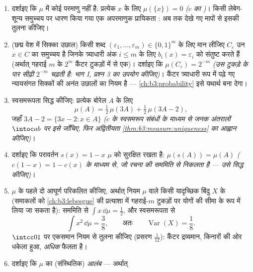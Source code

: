 \begin{problem}
\begin{enumerate}[resume]
\[        \]
        अर्थात् $\mu$ और $\lambda$ असंयुक्त वाहकों ($C$ और उसके
        पूरक) पर रहते हैं। इस स्थिति वाले दो  \emph{परस्पर
        एकल} कहलाते हैं, और $\mu \perp
        \lambda$ लिखा जाता है।
  \item दर्शाइए कि $\mu$ में कोई परमाणु नहीं है: प्रत्येक $x$
        के लिए $\mu(\{x\}) = 0$ \emph{($c$ का )}। किसी
        लेबेग-शून्य  समुच्चय पर धारण किया गया एक अपरमाणुक
        प्रायिकता : अब तक देखे गए मापों से इसकी तुलना कीजिए।
  \item (छद्म वेश में सिक्का उछाल) किसी शब्द $(\varepsilon_1,
        \dots, \varepsilon_m) \in \{0,1\}^m$ के लिए मान
        लीजिए $C_{\varepsilon}$ उन $x \in C$ का समुच्चय है जिनके त्र्याधारी अंक
        $i \leq m$ के लिए $b_i(x) = \varepsilon_i$ को संतुष्ट करते हैं (अर्थात् गहराई
        $m$ के $2^m$ कैंटर टुकड़ों में से एक)। दर्शाइए कि
        $\mu(C_\varepsilon) = 2^{-m}$ \emph{(उस टुकड़े के पार सीढ़ी $2^{-m}$ चढ़ती है:
        भाग I, प्रश्न 3 का उपयोग कीजिए)}। कैंटर  त्र्याधारी
        रूप में पढ़े गए न्यायसंगत सिक्कों की अनंत उछालों का नियम
        है --- \cref{ch:b3:probability} इसे यथार्थ बना देगा।
  \item स्वसमरूपता सिद्ध कीजिए: प्रत्येक बोरेल $A$ के लिए
        \[
        \mu(A) = \tfrac12\,\mu(3A) +
        \tfrac12\,\mu(3A - 2) ,
        \]
        जहाँ $3A - 2 = \{3x - 2 : x \in A\}$ \emph{($c$ के स्वसमरूप संबंधों के माध्यम से
        जनक अंतरालों $\intoc ab$ पर इसे जाँचिए, फिर अद्वितीयता \cref{thm:b3:measure:uniqueness}
        का आह्वान कीजिए)}।
  \item दर्शाइए कि परावर्तन $s(x) = 1 - x$ $\mu$ को सुरक्षित रखता है:
        $\mu(s(A)) = \mu(A)$ \emph{($c(1 - x) = 1 -
        c(x)$ के माध्यम से, जो रचना की सममिति से
        निकलता है --- उसे सिद्ध कीजिए)}।
  \item $\mu$ के पहले दो आघूर्ण परिकलित कीजिए, अर्थात् नियम
        $\mu$ वाले किसी यादृच्छिक बिंदु $X$ के (समाकलों को
        \cref{ch:b3:lebesgue} की प्रत्याशा में गहराई-$m$ टुकड़ों पर योगों की
        सीमा के रूप में लिया जा सकता है): सममिति से $\int x\,\dd\mu = \frac12$, और
        स्वसमरूपता से
        \[
        \int x^2\,\dd\mu = \frac38,
        \qquad\text{अतः}\qquad
        \operatorname{Var}(X) = \frac18 .
        \]
        $\intcc01$ पर एकसमान नियम से तुलना कीजिए (प्रसरण $\frac1{12}$): कैंटर
        द्रव्यमान, किनारों की ओर धकेला हुआ, \emph{अधिक} फैलता है।
  \item दर्शाइए कि $\mu$ का (संस्थितिक) \emph{आलंब} --- अर्थात्

\end{enumerate}
\end{problem}
